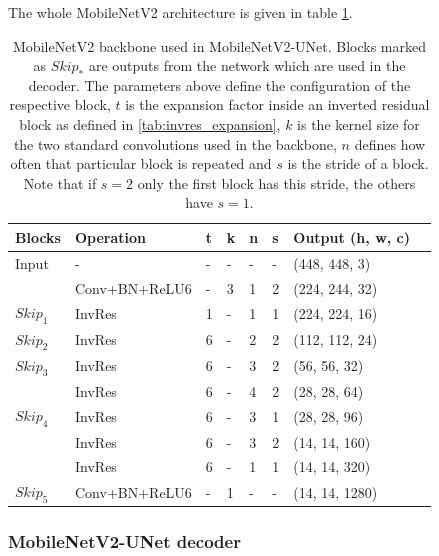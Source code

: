 The whole MobileNetV2 architecture is given in table \ref{tab:mobilenetv2_architecture}.

\begin{table} %
\begin{center}

\begin{tabular}{l|l|l|l|l|l|l|l}
\textbf{Blocks} & \textbf{Operation} & \textbf{t} & \textbf{k} & \textbf{n} & \textbf{s} & \textbf{Output (h, w, c)}\\
\hline
Input           & -             & - & - & - & - & (448, 448, 3) \\
                & Conv+BN+ReLU6 & - & 3 & 1 & 2 & (224, 244, 32) \\
$Skip_{1}$      & InvRes        & 1 & - & 1 & 1 & (224, 224, 16)\\
$Skip_{2}$      & InvRes        & 6 & - & 2 & 2 & (112, 112, 24) \\
$Skip_{3}$      & InvRes        & 6 & - & 3 & 2 & (56, 56, 32) \\
                & InvRes        & 6 & - & 4 & 2 & (28, 28, 64) \\
$Skip_{4}$      & InvRes        & 6 & - & 3 & 1 & (28, 28, 96) \\
                & InvRes        & 6 & - & 3 & 2 & (14, 14, 160) \\
                & InvRes        & 6 & - & 1 & 1 & (14, 14, 320) \\
$Skip_{5}$      & Conv+BN+ReLU6 & - & 1 & - & - & (14, 14, 1280) \\
\end{tabular}

\caption{MobileNetV2 backbone used in MobileNetV2-UNet. Blocks marked as $Skip_*$ are outputs from the network which are used in the decoder. The parameters above define the configuration of the respective block, $t$ is the expansion factor inside an inverted residual block as defined in \ref{tab:invres_expansion}, $k$ is the kernel size for the two standard convolutions used in the backbone, $n$ defines how often that particular block is repeated and $s$ is the stride of a block. Note that if $s = 2$ only the first block has this stride, the others have $s = 1$.}
\label{tab:mobilenetv2_architecture}
\end{center}
\end{table}

\subsubsection{MobileNetV2-UNet decoder}

